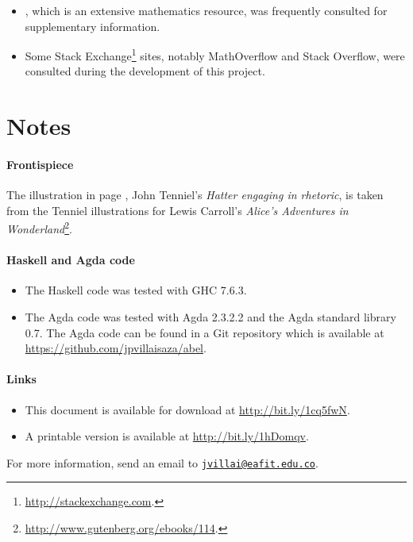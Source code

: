 \begin{itemize}
\item
  \textcite{weisstein-mathworld}, which is an extensive mathematics
  resource, was frequently consulted for supplementary information.

\item
  Some Stack Exchange\footnote{\url{http://stackexchange.com}.} sites,
  notably MathOverflow and Stack Overflow, were consulted during the
  development of this project.

\end{itemize}

\section*{Notes}
\label{sec:introduction-notes}

\paragraph{Frontispiece}

The illustration in page \pageref{fig:hatter}, John Tenniel's
\emph{Hatter engaging in rhetoric}, is taken from the Tenniel
illustrations for Lewis Carroll's \emph{Alice's Adventures in
  Wonderland}\footnote{\url{http://www.gutenberg.org/ebooks/114}.}.

\paragraph{Haskell and Agda code}

\begin{itemize}
\item
  The Haskell code was tested with GHC 7.6.3.

\item
  The Agda code was tested with Agda 2.3.2.2 and the Agda standard
  library 0.7. The Agda code can be found in a Git repository which is
  available at \url{https://github.com/jpvillaisaza/abel}.

\end{itemize}

\paragraph{Links}

\begin{itemize}
\item
  This document is available for download at
  \url{http://bit.ly/1cq5fwN}.

\item
  A printable version is available at \url{http://bit.ly/1hDomqv}.

\end{itemize}
For more information, send an email to
\href{mailto:jvillai@eafit.edu.co}{\nolinkurl{jvillai@eafit.edu.co}}.

\clearemptydoublepage
